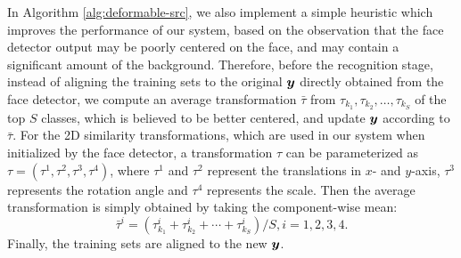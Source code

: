 \documentclass[10pt,journal,letterpaper,compsoc]{IEEEtran}
\begin{document}
In Algorithm \ref{alg:deformable-src}, we also implement a simple heuristic which improves the
performance of our system, based on the observation that the face detector output may be poorly centered on
the face, and may contain a significant amount of the background.  Therefore, before the recognition stage,
instead of aligning the training sets to the
original ${\boldsymbol{y}}$ directly obtained from the face detector, we
compute an average transformation $\bar{\tau}$ from $\tau_{k_1},
\tau_{k_2}, \ldots, \tau_{k_S}$ of the top $S$ classes, which
is believed to be better centered, and update ${\boldsymbol{y}}$ according to
$\bar{\tau}$. For the 2D similarity transformations, which are
used in our system when initialized by the face detector, a
transformation $\tau$ can be parameterized as $\tau = (\tau^1,
\tau^2, \tau^3, \tau^4)$, where $\tau^1$ and $\tau^2$ represent
the translations in $x$- and $y$-axis, $\tau^3$ represents the
rotation angle and $\tau^4$ represents the scale. Then the
average transformation is simply obtained by taking the
component-wise mean:
\begin{displaymath}
\bar{\tau}^i = (\tau_{k_1}^i + \tau_{k_2}^i + \cdots +
\tau_{k_S}^i) / S, i = 1,2,3,4.
\end{displaymath}
Finally, the training sets are aligned to the new ${\boldsymbol{y}}$.
\end{document}

